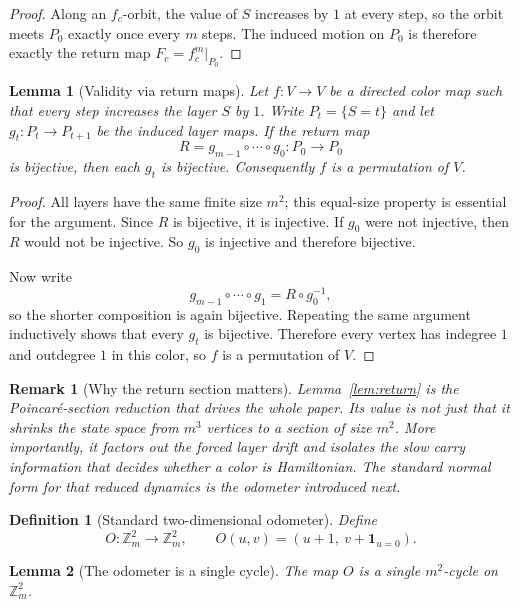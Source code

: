 \documentclass[11pt]{article}
\newtheorem{lemma}{Lemma}
\newtheorem{definition}{Definition}
\newtheorem{remark}{Remark}
\newcommand{\Zm}{\mathbb Z_m}
\begin{document}
\begin{proof}
Along an $f_c$-orbit, the value of $S$ increases by $1$ at every step, so the orbit meets $P_0$ exactly once every $m$ steps.
The induced motion on $P_0$ is therefore exactly the return map $F_c=f_c^m|_{P_0}$.
\end{proof}


\begin{lemma}[Validity via return maps]\label{lem:return-validity}
Let $f:V\to V$ be a directed color map such that every step increases the layer $S$ by $1$.
Write $P_t=\{S=t\}$ and let $g_t:P_t\to P_{t+1}$ be the induced layer maps.
If the return map
\[
R=g_{m-1}\circ\cdots\circ g_0:P_0\to P_0
\]
is bijective, then each $g_t$ is bijective.
Consequently $f$ is a permutation of $V$.
\end{lemma}

\begin{proof}
All layers have the same finite size $m^2$; this equal-size property is essential for the argument.
Since $R$ is bijective, it is injective.
If $g_0$ were not injective, then $R$ would not be injective.
So $g_0$ is injective and therefore bijective.

Now write
\[
g_{m-1}\circ\cdots\circ g_1 = R\circ g_0^{-1},
\]
so the shorter composition is again bijective.
Repeating the same argument inductively shows that every $g_t$ is bijective.
Therefore every vertex has indegree $1$ and outdegree $1$ in this color, so $f$ is a permutation of $V$.
\end{proof}

\begin{remark}[Why the return section matters]\label{rem:return-odometer}
Lemma~\ref{lem:return} is the Poincar\'e-section reduction that drives the whole paper.
Its value is not just that it shrinks the state space from $m^3$ vertices to a section of size $m^2$.
More importantly, it factors out the forced layer drift and isolates the slow carry information that decides whether a color is Hamiltonian.
The standard normal form for that reduced dynamics is the odometer introduced next.
\end{remark}

\begin{definition}[Standard two-dimensional odometer]
Define
\[
O:\Zm^2\to \Zm^2,\qquad O(u,v)=(u+1,\ v+\mathbf 1_{u=0}).
\]
\end{definition}

\begin{lemma}[The odometer is a single cycle]\label{lem:odometer}
The map $O$ is a single $m^2$-cycle on $\Zm^2$.
\end{lemma}
\end{document}

